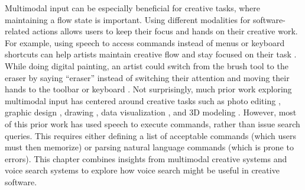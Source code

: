 Multimodal input can be especially beneficial for creative tasks, where maintaining a flow state is important. Using different modalities for software-related actions allows users to keep their focus and hands on their creative work. For example, using speech to access commands instead of menus or keyboard shortcuts can help artists maintain creative flow and stay focused on their task \cite{Kim2019, Sedivy1999}. While doing digital painting, an artist could switch from the brush tool to the eraser by saying ``eraser'' instead of switching their attention and moving their hands to the toolbar or keyboard \cite{Kim2019}. Not surprisingly, much prior work exploring multimodal input has centered around creative tasks such as photo editing \cite{Laput2013}, graphic design \cite{Kim2019}, drawing \cite{Sedivy1999, Pausch1991}, data visualization \cite{Setlur2016}, and 3D modeling \cite{Sharma2011}. However, most of this prior work has used speech to execute commands, rather than issue search queries. This requires either defining a list of acceptable commands (which users must then memorize) or parsing natural language commands (which is prone to errors). This chapter combines insights from multimodal creative systems and voice search systems to explore how voice search might be useful in creative software.
